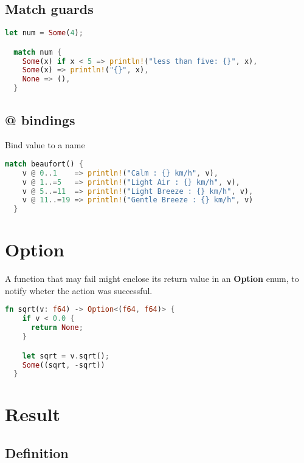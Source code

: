 \documentclass{article}
\begin{document}
\pagebreak

\subsection{Match guards}

\begin{lstlisting}[language=Rust, style=boxed, numbers=none]
  let num = Some(4);

  match num {
    Some(x) if x < 5 => println!("less than five: {}", x),
    Some(x) => println!("{}", x),
    None => (),
  }
\end{lstlisting}

\subsection{@ bindings}

Bind value to a name

\begin{lstlisting}[language=Rust, style=boxed, numbers=none]
  match beaufort() {
    v @ 0..1    => println!("Calm : {} km/h", v),
    v @ 1..=5   => println!("Light Air : {} km/h", v),
    v @ 5..=11  => println!("Light Breeze : {} km/h", v),
    v @ 11..=19 => println!("Gentle Breeze : {} km/h", v)
  }
\end{lstlisting}

\pagebreak

\section{Option}

A function that may fail might enclose its return value in an
\textbf{Option} enum, to notify wheter the action was successful.

\begin{lstlisting}[language=Rust, style=boxed, numbers=none]
  fn sqrt(v: f64) -> Option<(f64, f64)> {
    if v < 0.0 {
      return None;
    }

    let sqrt = v.sqrt();
    Some((sqrt, -sqrt))
  }
\end{lstlisting}

\section{Result}

\subsection{Definition}
\end{document}
